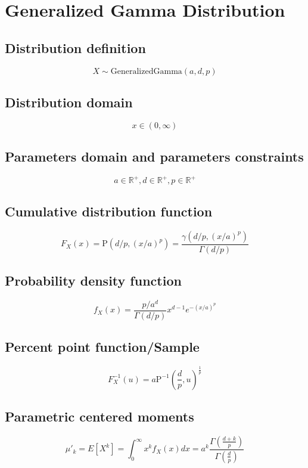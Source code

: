 \documentclass{article}
\begin{document}
\newpage
\section{Generalized Gamma Distribution}
\subsection{Distribution definition}
\begin{equation*} X\sim\mathrm{GeneralizedGamma}\left(a,d,p\right) \end{equation*}
\subsection{Distribution domain}
\begin{equation*} x\in\left(0,\infty\right) \end{equation*}
\subsection{Parameters domain and parameters constraints}
\begin{equation*} a\in\mathbb{R}^{+}, d\in\mathbb{R}^{+}, p\in\mathbb{R}^{+} \end{equation*}
\subsection{Cumulative distribution function}
\begin{equation*} F_{X}\left(x\right)=\text{P}(d/p,(x/a)^p)=\frac{\gamma(d/p,(x/a)^p)}{\Gamma(d/p)} \end{equation*}
\subsection{Probability density function}
\begin{equation*} f_{X}\left(x\right)=\frac{p/a^d}{\Gamma(d/p)} x^{d-1}e^{-(x/a)^p} \end{equation*}
\subsection{Percent point function/Sample}
\begin{equation*} F^{-1}_{X}\left(u\right)=a\text{P}^{-1}\left(\frac{d}{p},u\right)^{\frac{1}{p}} \end{equation*}
\subsection{Parametric centered moments}
\begin{equation*} \mu'_{k}=E[X^k]=\int_{0}^{\infty}x^{k}f_{X}\left(x\right)dx=a^k\frac{\Gamma (\frac{d+k}{p})}{\Gamma(\frac{d}{p})} \end{equation*}
\end{document}
